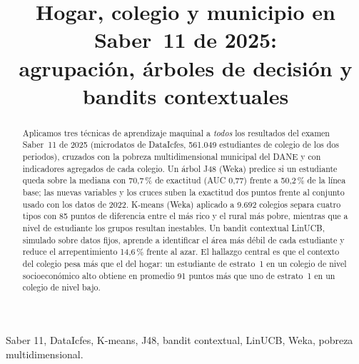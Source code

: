 \documentclass[conference]{IEEEtran}
\begin{document}
\title{Hogar, colegio y municipio en Saber~11 de 2025:\\ agrupación, árboles de decisión y bandits contextuales}

\author{
\and
{}
}

\maketitle

\begin{abstract}
Aplicamos tres técnicas de aprendizaje maquinal a \emph{todos} los resultados del examen Saber~11 de 2025 (microdatos de DataIcfes, 561.049 estudiantes de colegio de los dos periodos), cruzados con la pobreza multidimensional municipal del DANE y con indicadores agregados de cada colegio. Un árbol J48 (Weka) predice si un estudiante queda sobre la mediana con 70,7\,\% de exactitud (AUC 0,77) frente a 50,2\,\% de la línea base; las nuevas variables y los cruces suben la exactitud dos puntos frente al conjunto usado con los datos de 2022. K-means (Weka) aplicado a 9.692 colegios separa cuatro tipos con 85 puntos de diferencia entre el más rico y el rural más pobre, mientras que a nivel de estudiante los grupos resultan inestables. Un bandit contextual LinUCB, simulado sobre datos fijos, aprende a identificar el área más débil de cada estudiante y reduce el arrepentimiento 14,6\,\% frente al azar. El hallazgo central es que el contexto del colegio pesa más que el del hogar: un estudiante de estrato~1 en un colegio de nivel socioeconómico alto obtiene en promedio 91 puntos más que uno de estrato~1 en un colegio de nivel bajo.
\end{abstract}

\begin{IEEEkeywords}
Saber 11, DataIcfes, K-means, J48, bandit contextual, LinUCB, Weka, pobreza multidimensional.
\end{IEEEkeywords}
\end{document}

